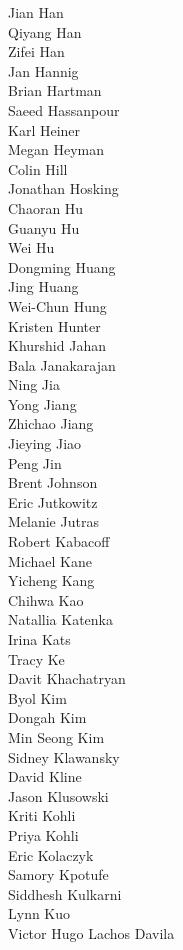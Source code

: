 Jian Han\\
Qiyang Han\\
Zifei Han\\
Jan Hannig\\
Brian Hartman\\
Saeed Hassanpour\\
Karl Heiner\\
Megan Heyman\\
Colin Hill\\
Jonathan Hosking\\
Chaoran Hu\\
Guanyu Hu\\
Wei Hu\\
Dongming Huang\\
Jing Huang\\
Wei-Chun Hung\\
Kristen Hunter\\
Khurshid Jahan\\
Bala Janakarajan\\
Ning Jia\\
Yong Jiang\\
Zhichao Jiang\\
Jieying Jiao\\
Peng Jin\\
Brent Johnson\\
Eric Jutkowitz\\
Melanie Jutras\\
Robert Kabacoff\\
Michael Kane\\
Yicheng Kang\\
Chihwa Kao\\
Natallia Katenka\\
Irina Kats\\
Tracy Ke\\
Davit Khachatryan\\
Byol Kim\\
Dongah Kim\\
Min Seong Kim\\
Sidney Klawansky\\
David Kline\\
Jason Klusowski\\
Kriti Kohli\\
Priya Kohli\\
Eric Kolaczyk\\
Samory Kpotufe\\
Siddhesh Kulkarni\\
Lynn Kuo\\
Victor Hugo Lachos Davila\\
